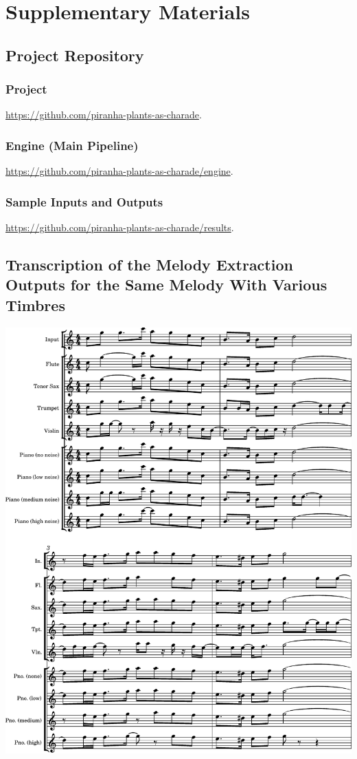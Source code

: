 \section{Supplementary Materials}
\label{sec:supplementary}

\subsection{Project Repository}
\label{sec:code}

\subsubsection{Project} \url{https://github.com/piranha-plants-as-charade}.
\subsubsection{Engine (Main Pipeline)} \url{https://github.com/piranha-plants-as-charade/engine}.
\subsubsection{Sample Inputs and Outputs} \url{https://github.com/piranha-plants-as-charade/results}.

\clearpage
\subsection{Transcription of the Melody Extraction Outputs for the Same Melody With Various Timbres}
\label{sec:sheet_music_melody}

\includegraphics[page=1, width=\linewidth]{materials/piranha_melody.pdf}
\clearpage

